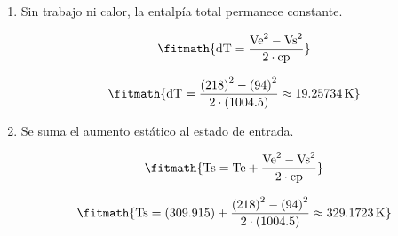 \begin{enumerate}

\item Sin trabajo ni calor, la entalpía total permanece constante.

\[\fitmath{\mathrm{dT}=\frac{{\mathrm{Ve}}^{2}-{\mathrm{Vs}}^{2}}{2\cdot \mathrm{cp}}}\]

\[\fitmath{\mathrm{dT}=\frac{{(218)}^{2}-{(94)}^{2}}{2\cdot (1004.5)}\approx 19.25734\,\mathrm{K}}\]

\item Se suma el aumento estático al estado de entrada.

\[\fitmath{\mathrm{Ts}=\mathrm{Te}+\frac{{\mathrm{Ve}}^{2}-{\mathrm{Vs}}^{2}}{2\cdot \mathrm{cp}}}\]

\[\fitmath{\mathrm{Ts}=(309.915)+\frac{{(218)}^{2}-{(94)}^{2}}{2\cdot (1004.5)}\approx 329.1723\,\mathrm{K}}\]

\end{enumerate}
